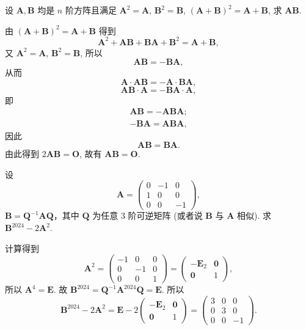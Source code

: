 \documentclass[../../main.tex]{subfiles}
\begin{document}
\begin{example}
设 $\boldsymbol{A},\boldsymbol{B}$ 均是 $n$ 阶方阵且满足 $\boldsymbol{A}^2 = \boldsymbol{A}$, $\boldsymbol{B}^2 = \boldsymbol{B}$, $(\boldsymbol{A} + \boldsymbol{B})^2 = \boldsymbol{A} + \boldsymbol{B}$, 求 $\boldsymbol{AB}$.
\end{example}
\begin{solution}
由 $(\boldsymbol{A} + \boldsymbol{B})^2 = \boldsymbol{A} + \boldsymbol{B}$ 得到
\[
\boldsymbol{A}^2 + \boldsymbol{AB} + \boldsymbol{BA} + \boldsymbol{B}^2 = \boldsymbol{A} + \boldsymbol{B},
\]
又 $\boldsymbol{A}^2 = \boldsymbol{A}$, $\boldsymbol{B}^2 = \boldsymbol{B}$, 所以
\[
\boldsymbol{AB} = -\boldsymbol{BA},
\]
从而
\[
\boldsymbol{A} \cdot \boldsymbol{AB} = -\boldsymbol{A} \cdot \boldsymbol{BA},
\]
\[
\boldsymbol{AB} \cdot \boldsymbol{A} = -\boldsymbol{BA} \cdot \boldsymbol{A},
\]
即
\begin{gather*}
\boldsymbol{AB}=-\boldsymbol{ABA};
\\
-\boldsymbol{BA}=\boldsymbol{ABA},
\end{gather*}
因此
\[
\boldsymbol{AB} = \boldsymbol{BA}.
\]
由此得到 $2\boldsymbol{AB} = \boldsymbol{O}$, 故有 $\boldsymbol{AB} = \boldsymbol{O}$.

\end{solution}

\begin{example}
设
\[
\boldsymbol{A} = \begin{pmatrix} 0 & -1 & 0 \\ 1 & 0 & 0 \\ 0 & 0 & -1 \end{pmatrix},
\]
\(\boldsymbol{B} = \boldsymbol{Q}^{-1}\boldsymbol{A}\boldsymbol{Q}\)，其中 \(\boldsymbol{Q}\) 为任意 3 阶可逆矩阵 (或者说 \(\boldsymbol{B}\) 与 \(\boldsymbol{A}\) 相似). 求 \(\boldsymbol{B}^{2024} - 2\boldsymbol{A}^2\).
\end{example}
\begin{solution}
计算得到
\[
\boldsymbol{A}^2 = \begin{pmatrix} -1 & 0 & 0 \\ 0 & -1 & 0 \\ 0 & 0 & 1 \end{pmatrix} = \begin{pmatrix} -\boldsymbol{E}_2 & \boldsymbol{0} \\ \boldsymbol{0} & 1 \end{pmatrix},
\]
所以 \(\boldsymbol{A}^4 = \boldsymbol{E}\). 故 \(\boldsymbol{B}^{2024} = \boldsymbol{Q}^{-1}\boldsymbol{A}^{2024}\boldsymbol{Q} = \boldsymbol{E}\). 所以
\[
\boldsymbol{B}^{2024} - 2\boldsymbol{A}^2 = \boldsymbol{E} - 2\begin{pmatrix} -\boldsymbol{E}_2 & \boldsymbol{0} \\ \boldsymbol{0} & 1 \end{pmatrix} = \begin{pmatrix} 3 & 0 & 0 \\ 0 & 3 & 0 \\ 0 & 0 & -1 \end{pmatrix}.
\]

\end{solution}
\end{document}
